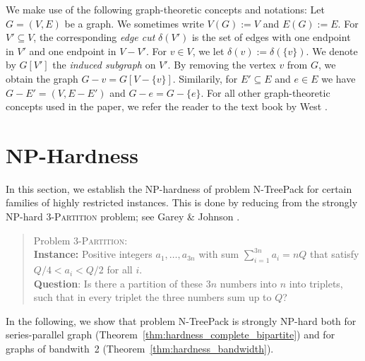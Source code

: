\documentclass[runningheads]{llncs}
\newcommand{\set}[1]{\{ #1 \}}
\newcommand{\xxxNTP}{{\sc N-TreePack}}
\begin{document}
We make use of the following graph-theoretic concepts and notations: 
Let $G=(V,E)$ be a graph. We sometimes write $V(G):=V$ and $E(G):=E$. 
For $V'\subseteq V$, the corresponding \emph{edge cut} $\delta(V')$ is the set of edges with
one endpoint in $V'$ and one endpoint in $V-V'$. 
For $v\in V$, we let $\delta(v) := \delta(\set{v})$. 
We denote by $G[V']$ the \emph{induced subgraph} on $V'$. 
By removing the vertex $v$ from $G$, we obtain the graph $G-v=G[V-\set{v}]$. 
Similarily, for $E'\subseteq E$ and $e\in E$ we have $G-E'=(V,E-E')$ and $G-e=G-\set{e}$.
For all other graph-theoretic concepts used in the paper, we refer the reader to the
text book by West \cite{WestBook}.


\section{NP-Hardness}
\label{sec:hardness}
In this section, we establish the NP-hardness of problem {\xxxNTP} for certain families of
highly restricted instances. 
This is done by reducing from the strongly NP-hard \textsc{3-Partition} problem;
see Garey \& Johnson \cite{garey1979computers}. 
\begin{quote}
Problem \textsc{3-Partition}: 
\\
\textbf{Instance:} Positive integers $a_1,\ldots,a_{3n}$ with sum $\sum_{i=1}^{3n}a_i=nQ$ that satisfy 
$Q/4<a_i<Q/2$ for all $i$.
\\
\textbf{Question}: Is there a partition of these $3n$ numbers into $n$ into triplets, such that in 
every triplet the three numbers sum up to $Q$?  
\end{quote}
In the following, we show that problem {\xxxNTP} is strongly NP-hard both for series-parallel graph 
(Theorem~\ref{thm:hardness_complete_bipartite}) and for graphs of bandwith~2 (Theorem~\ref{thm:hardness_bandwidth}). 
\end{document}
